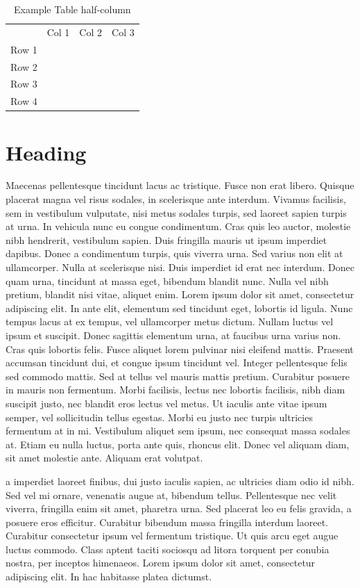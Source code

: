 \documentclass[12pt,a4paper,twoside, twocolumn]{article}
\begin{document}
\begin{table}[t]
\caption{Example Table half-column}
\begin{tabular}{llll} 
& Col 1 & Col 2 & Col 3\\
Row 1 & & & \\
Row 2 & & & \\
Row 3 & & & \\
Row 4 & & & \\
\end{tabular}
\end{table}


\blindtext

\section{Heading}
Maecenas pellentesque tincidunt lacus ac tristique. Fusce non erat libero. Quisque placerat magna vel risus sodales, in scelerisque ante interdum. Vivamus facilisis, sem in vestibulum vulputate, nisi metus sodales turpis, sed laoreet sapien turpis at urna. In vehicula nunc eu congue condimentum. Cras quis leo auctor, molestie nibh hendrerit, vestibulum sapien. Duis fringilla mauris ut ipsum imperdiet dapibus. Donec a condimentum turpis, quis viverra urna. Sed varius non elit at ullamcorper. Nulla at scelerisque nisi. Duis imperdiet id erat nec interdum. Donec quam urna, tincidunt at massa eget, bibendum blandit nunc. Nulla vel nibh pretium, blandit nisi vitae, aliquet enim. Lorem ipsum dolor sit amet, consectetur adipiscing elit. In ante elit, elementum sed tincidunt eget, lobortis id ligula.
Nunc tempus lacus at ex tempus, vel ullamcorper metus dictum. Nullam luctus vel ipsum et suscipit. Donec sagittis elementum urna, at faucibus urna varius non. Cras quis lobortis felis. Fusce aliquet lorem pulvinar nisi eleifend mattis. Praesent accumsan tincidunt dui, et congue ipsum tincidunt vel. Integer pellentesque felis sed commodo mattis. Sed at tellus vel mauris mattis pretium. Curabitur posuere in mauris non fermentum. Morbi facilisis, lectus nec lobortis facilisis, nibh diam suscipit justo, nec blandit eros lectus vel metus. Ut iaculis ante vitae ipsum semper, vel sollicitudin tellus egestas. Morbi eu justo nec turpis ultricies fermentum at in mi. Vestibulum aliquet sem ipsum, nec consequat massa sodales at. Etiam eu nulla luctus, porta ante quis, rhoncus elit. Donec vel aliquam diam, sit amet molestie ante. Aliquam erat volutpat.

a imperdiet laoreet finibus, dui justo iaculis sapien, ac ultricies diam odio id nibh. Sed vel mi ornare, venenatis augue at, bibendum tellus. Pellentesque nec velit viverra, fringilla enim sit amet, pharetra urna. Sed placerat leo eu felis gravida, a posuere eros efficitur. Curabitur bibendum massa fringilla interdum laoreet. Curabitur consectetur ipsum vel fermentum tristique. Ut quis arcu eget augue luctus commodo. Class aptent taciti sociosqu ad litora torquent per conubia nostra, per inceptos himenaeos. Lorem ipsum dolor sit amet, consectetur adipiscing elit. In hac habitasse platea dictumst.
\end{document}
